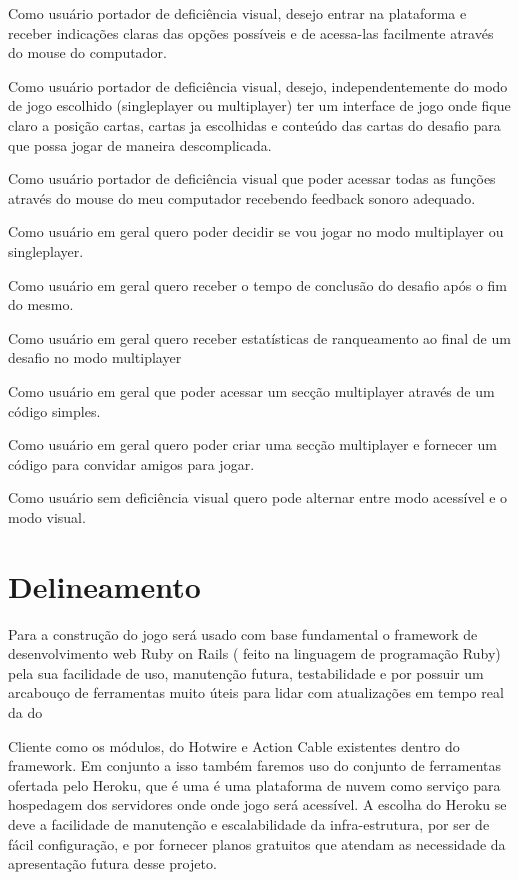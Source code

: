 \begin{alineascomnumero}
  \item Como usuário portador de deficiência visual, desejo entrar na plataforma e receber indicações claras das opções possíveis e de acessa-las facilmente através do mouse do computador.
  \item Como usuário portador de deficiência visual, desejo, independentemente do modo de jogo escolhido (singleplayer ou multiplayer) ter um interface de jogo onde fique claro a posição cartas, cartas ja escolhidas e conteúdo das cartas do desafio para que possa jogar de maneira descomplicada.
  \item Como usuário portador de deficiência visual que poder acessar todas as funções através do mouse do meu computador recebendo feedback sonoro adequado.
  \item Como usuário em geral quero poder decidir se vou jogar no modo multiplayer ou singleplayer.
  \item Como usuário em geral quero receber o tempo de conclusão do desafio após o fim do mesmo.
  \item Como usuário em geral quero receber estatísticas de ranqueamento ao final de um desafio no modo multiplayer
  \item Como usuário em geral que poder acessar um secção multiplayer através de um código simples.
  \item Como usuário em geral quero poder criar uma secção multiplayer e fornecer um código para convidar amigos para jogar.
  \item Como usuário sem deficiência visual quero pode alternar entre modo acessível e o modo visual.
\end{alineascomnumero}

\section{Delineamento}
Para a construção do jogo será usado com base fundamental o framework de desenvolvimento web Ruby on Rails ( feito na linguagem de programação Ruby) pela sua facilidade de uso, manutenção futura, testabilidade e por possuir um arcabouço de ferramentas muito úteis para lidar com atualizações em tempo real da do

Cliente como os módulos, do Hotwire e Action Cable existentes dentro do framework.
Em conjunto a isso também faremos uso do conjunto de ferramentas ofertada pelo Heroku, que é uma é uma plataforma de nuvem como serviço para hospedagem dos servidores onde onde jogo será acessível. A escolha do Heroku se deve a facilidade de manutenção e escalabilidade da infra-estrutura, por ser de fácil configuração, e por fornecer planos gratuitos que atendam as necessidade da apresentação futura desse projeto.

